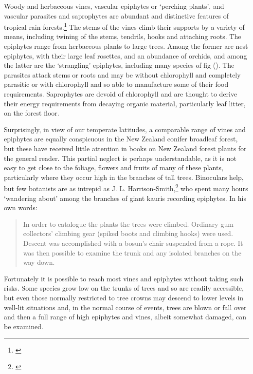 Woody and herbaceous vines, vascular epiphytes or `perching plants', and vascular parasites and saprophytes are abundant and distinctive features of tropical rain forests.\footnote{\cite{richards1952tropical}}
The stems of the vines climb their supports by a variety of means, including twining of the stems, tendrils, hooks and attaching roots.
The epiphytes range from herbaceous plants to large trees.
Among the former are nest epiphytes, with their large leaf rosettes, and an abundance of orchids, and among the latter are the `strangling' epiphytes, including many species of fig ().
The parasites attack stems or roots and may be without chlorophyll and completely parasitic or with chlorophyll and so able to manufacture some of their food requirements.
Saprophytes are devoid of chlorophyll and are thought to derive their energy requirements from decaying organic material, particularly leaf litter, on the forest floor.

Surprisingly, in view of our temperate latitudes, a comparable range of vines and epiphytes are equally conspicuous in the New Zealand conifer broadleaf forest, but these have received little attention in books on New Zealand forest plants for the general reader.
This partial neglect is perhaps understandable, as it is not easy to get close to the foliage, flowers and fruits of many of these plants, particularly where they occur high in the branches of tall trees.
Binoculars help, but few botanists are as intrepid as J. L. Harrison-Smith,\footnote{\cite{harrisonsmith1938kauri}} who spent many hours `wandering about' among the branches of giant kauris recording epiphytes.
In his own words:

\begin{quote}
	In order to catalogue the plants the trees were climbed.
	Ordinary gum collectors' climbing gear (spiked boots and climbing hooks) were used.
	Descent was accomplished with a bosun's chair suspended from a rope.
	It was then possible to examine the trunk and any isolated branches on the way down.
\end{quote}

Fortunately it is possible to reach most vines and epiphytes without taking such risks.
Some species grow low on the trunks of trees and so are readily accessible, but even those normally restricted to tree crowns may descend to lower levels in well-lit situations and, in the normal course of events, trees are blown or fall over and then a full range of high epiphytes and vines, albeit somewhat damaged, can be examined.

